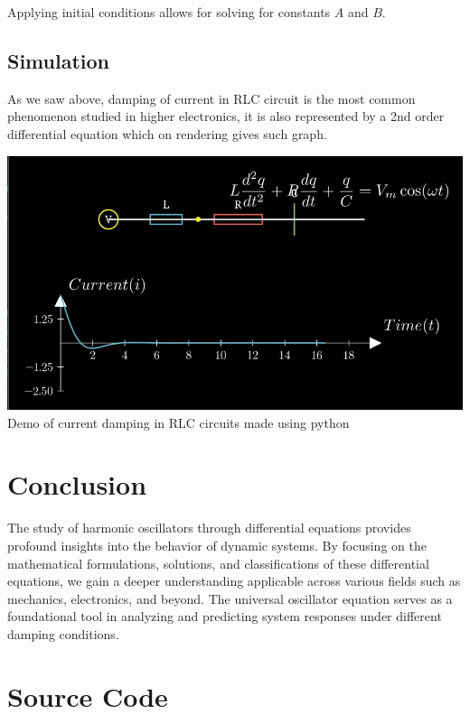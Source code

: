 \documentclass[12pt,a4paper]{article}
\begin{document}
Applying initial conditions allows for solving for constants \( A \) and \( B \).


\subsection{Simulation}

As we saw above, damping of current in RLC circuit is the most common phenomenon studied in higher electronics, it is also represented by a 2nd order differential equation which on rendering gives such graph.

\begin{center}
    \includegraphics[scale=0.3]{damped_rlc}\\
    Demo of current damping in RLC circuits made using python
\end{center}


\section{Conclusion}

The study of harmonic oscillators through differential equations provides profound insights into the behavior of dynamic systems. By focusing on the mathematical formulations, solutions, and classifications of these differential equations, we gain a deeper understanding applicable across various fields such as mechanics, electronics, and beyond. The universal oscillator equation serves as a foundational tool in analyzing and predicting system responses under different damping conditions. 

\newpage
\section{Source Code}
\end{document}
